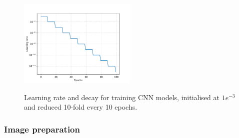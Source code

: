 \documentclass[a4paper,11pt,twoside,openright]{scrbook}
\begin{document}
\begin{figure}
    \captionsetup{width=0.8\textwidth}
    \caption[CNN learning rate and decay]{
Learning rate and decay for training CNN models, initialised at $1e^{-3}$ and reduced 10-fold every 10 epochs.
}
    \includegraphics[width=0.5\textwidth]{ch2learningRate}
    \label{figure:learningRate}
\end{figure}


\subsubsection{Image preparation}

\end{document}
